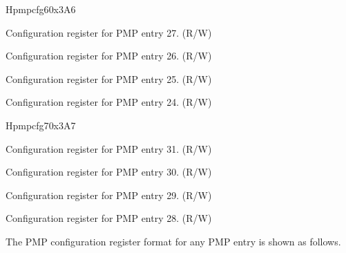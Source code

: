 \begin{register}{H}{pmpcfg6}{0x3A6}
\label{regdesc:pmpcfg6}%
%
%
%
%
\regnewline%
\begin{regdesc}
\begin{reglist}
\label{fielddesc:pmp27cfg}\item [pmp27cfg] Configuration register for PMP entry 27. (R/W)
\label{fielddesc:pmp26cfg}\item [pmp26cfg] Configuration register for PMP entry 26. (R/W)
\label{fielddesc:pmp25cfg}\item [pmp25cfg] Configuration register for PMP entry 25. (R/W)
\label{fielddesc:pmp24cfg}\item [pmp24cfg] Configuration register for PMP entry 24. (R/W)
\end{reglist}
\end{regdesc}
\end{register}

\begin{register}{H}{pmpcfg7}{0x3A7}
\label{regdesc:pmpcfg7}%
%
%
%
%
\regnewline%
\begin{regdesc}
\begin{reglist}
\label{fielddesc:pmp31cfg}\item [pmp31cfg] Configuration register for PMP entry 31. (R/W)
\label{fielddesc:pmp30cfg}\item [pmp30cfg] Configuration register for PMP entry 30. (R/W)
\label{fielddesc:pmp29cfg}\item [pmp29cfg] Configuration register for PMP entry 29. (R/W)
\label{fielddesc:pmp28cfg}\item [pmp28cfg] Configuration register for PMP entry 28. (R/W)
\end{reglist}
\end{regdesc}
\end{register}

The PMP configuration register format for any PMP entry is shown as follows.


